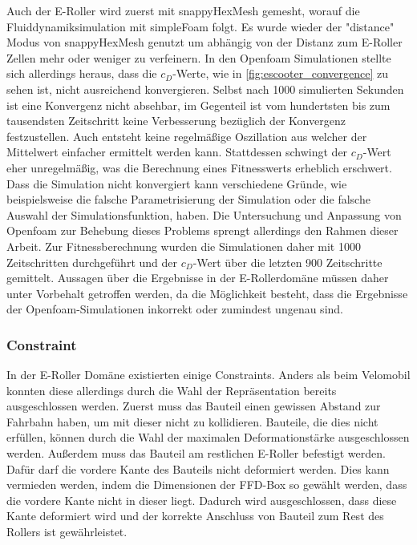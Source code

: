 Auch der E-Roller wird zuerst mit snappyHexMesh gemesht, worauf die Fluiddynamiksimulation mit simpleFoam folgt. 
Es wurde wieder der "distance" Modus von snappyHexMesh genutzt um abhängig von der Distanz zum E-Roller Zellen mehr oder weniger zu verfeinern.
In den Openfoam Simulationen stellte sich allerdings heraus, dass die $c_D$-Werte, wie in \cref{fig:escooter_convergence} zu sehen ist, nicht ausreichend konvergieren.
Selbst nach 1000 simulierten Sekunden ist eine Konvergenz nicht absehbar, im Gegenteil ist vom hundertsten bis zum tausendsten Zeitschritt keine Verbesserung bezüglich der Konvergenz festzustellen.
Auch entsteht keine regelmäßige Oszillation aus welcher der Mittelwert einfacher ermittelt werden kann.
Stattdessen schwingt der $c_D$-Wert eher unregelmäßig, was die Berechnung eines Fitnesswerts erheblich erschwert.
Dass die Simulation nicht konvergiert kann verschiedene Gründe, wie beispielsweise die falsche Parametrisierung der Simulation oder die falsche Auswahl der Simulationsfunktion, haben.
Die Untersuchung und Anpassung von Openfoam zur Behebung dieses Problems sprengt allerdings den Rahmen dieser Arbeit.
Zur Fitnessberechnung wurden die Simulationen daher mit 1000 Zeitschritten durchgeführt und der $c_D$-Wert über die letzten 900 Zeitschritte gemittelt.
Aussagen über die Ergebnisse in der E-Rollerdomäne müssen daher unter Vorbehalt getroffen werden, da die Möglichkeit besteht, dass die Ergebnisse der Openfoam-Simulationen inkorrekt oder zumindest ungenau sind.

\subsubsection{Constraint}

In der E-Roller Domäne existierten einige Constraints. Anders als beim Velomobil konnten diese allerdings durch die Wahl der Repräsentation bereits ausgeschlossen werden.
Zuerst muss das Bauteil einen gewissen Abstand zur Fahrbahn haben, um mit dieser nicht zu kollidieren.
Bauteile, die dies nicht erfüllen, können durch die Wahl der maximalen Deformationstärke ausgeschlossen werden.
Außerdem muss das Bauteil am restlichen E-Roller befestigt werden. Dafür darf die vordere Kante des Bauteils nicht deformiert werden.
Dies kann vermieden werden, indem die Dimensionen der FFD-Box so gewählt werden, dass die vordere Kante nicht in dieser liegt.
Dadurch wird ausgeschlossen, dass diese Kante deformiert wird und der korrekte Anschluss von Bauteil zum Rest des Rollers ist gewährleistet.

